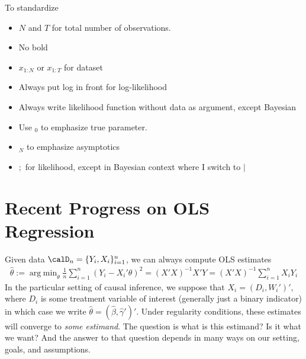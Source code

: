 \documentclass[12pt]{article}
\theoremstyle{plain}
\theoremstyle{definition}
\theoremstyle{remark}
\DeclareMathOperator*{\argmin}{arg\;min}
\newcommand{\sumin}{\sum^n_{i=1}}
\begin{document}
To standardize
\begin{itemize}
  \item $N$ and $T$ for total number of observations.
  \item No bold
  \item $x_{1:N}$ or $x_{1:T}$ for dataset
  \item Always put log in front for log-likelihood
  \item Always write likelihood function without data as argument,
    except Bayesian
  \item Use ${}_0$ to emphasize true parameter.
  \item ${}_N$ to emphasize asymptotics
  \item $;$ for likelihood, except in Bayesian context where I switch to
    $|$
\end{itemize}






\clearpage
\section{Recent Progress on OLS Regression}

Given data $\calD_n = \{Y_i,X_i\}_{i=1}^n$,
we can always compute OLS estimates
\begin{align*}
  \hat{\theta}
  :=
  \argmin_\theta
  \frac{1}{n}
  \sumin
  (Y_i-X_i'\theta)^2
  =
  (X'X)^{-1}X'Y
  =
  (X'X)^{-1}
  \sumin
  X_iY_i
\end{align*}
In the particular setting of causal inference, we suppose that
$X_i=(D_i,W_i')'$, where $D_i$ is some treatment variable of interest
(generally just a binary indicator) in which case we write
$\hat{\theta}= (\hat{\beta},\hat{\gamma}')'$.
Under regularity conditions, these estimates will converge to
\emph{some estimand}.
The question is what is this estimand?
Is it what we want?
And the answer to that question depends in many ways on our setting,
goals, and assumptions.
\end{document}
